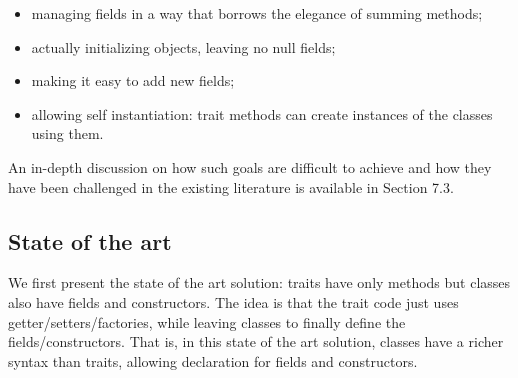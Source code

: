 \begin{itemize}
\item managing fields in a way that borrows the elegance of summing methods;
\item actually initializing objects, leaving no null fields;
\item making it easy to add new fields;
\item allowing self instantiation: trait methods can create instances of the classes using them.
\end{itemize}
An in-depth discussion on how such goals are 
difficult to achieve and how they have been challenged
in the existing literature is available in Section 7.3.
\subsection{State of the art}
We first present the state of the art solution: 
traits have only methods but classes also have fields and constructors.
The idea is that the trait code just uses getter/setters/factories, while leaving
classes to finally define the fields/constructors. That
is, in this state of the art solution, classes have a richer syntax than traits, allowing
declaration for fields and constructors. 

